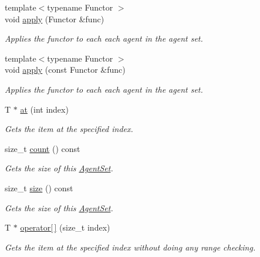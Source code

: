 \begin{DoxyCompactItemize}
{\footnotesize template$<$typename Functor $>$ }\\void \hyperlink{classrepast_1_1relogo_1_1_agent_set_ad3598fac70650951640e6c114139ae3b}{apply} (Functor \&func)
\begin{DoxyCompactList}\small\item\em Applies the functor to each each agent in the agent set. \end{DoxyCompactList}\item 
{\footnotesize template$<$typename Functor $>$ }\\void \hyperlink{classrepast_1_1relogo_1_1_agent_set_a7504d1d703d7fa46ce159a4d1b2f59fc}{apply} (const Functor \&func)
\begin{DoxyCompactList}\small\item\em Applies the functor to each each agent in the agent set. \end{DoxyCompactList}\item 
T $\ast$ \hyperlink{classrepast_1_1relogo_1_1_agent_set_a2c6200d20ec50279d5e52ffedd8f763e}{at} (int index)
\begin{DoxyCompactList}\small\item\em Gets the item at the specified index. \end{DoxyCompactList}\item 
size\-\_\-t \hyperlink{classrepast_1_1relogo_1_1_agent_set_aa3a44b933b292416299f4da0ce39d0ae}{count} () const 
\begin{DoxyCompactList}\small\item\em Gets the size of this \hyperlink{classrepast_1_1relogo_1_1_agent_set}{Agent\-Set}. \end{DoxyCompactList}\item 
size\-\_\-t \hyperlink{classrepast_1_1relogo_1_1_agent_set_abb4a6f94c42cf89dff6f08f1eb47ab51}{size} () const 
\begin{DoxyCompactList}\small\item\em Gets the size of this \hyperlink{classrepast_1_1relogo_1_1_agent_set}{Agent\-Set}. \end{DoxyCompactList}\item 
T $\ast$ \hyperlink{classrepast_1_1relogo_1_1_agent_set_a7a0f373b6f05f4d01a9eaff067b7d514}{operator\mbox{[}$\,$\mbox{]}} (size\-\_\-t index)
\begin{DoxyCompactList}\small\item\em Gets the item at the specified index without doing any range checking. \end{DoxyCompactList}\item 

\end{DoxyCompactItemize}
